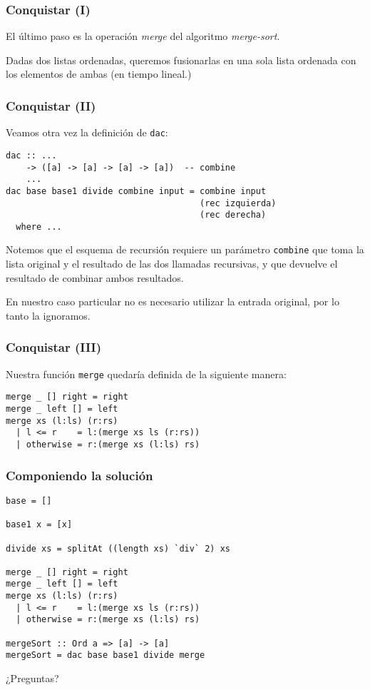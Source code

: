 \documentclass[spanish]{beamer}
\begin{document}
\begin{frame}
  \frametitle{Conquistar (I)}

  El último paso es la operación \textit{merge} del algoritmo
  \textit{merge-sort}.

  \vspace{1em}

  Dadas dos listas ordenadas, queremos fusionarlas en una
  sola lista ordenada con los elementos de ambas (en tiempo lineal.)
\end{frame}

\begin{frame}[fragile]
  \frametitle{Conquistar (II)}

  Veamos otra vez la definición de \texttt{dac}:

  \vspace{1em}

  \begin{Verbatim}
dac :: ...
    -> ([a] -> [a] -> [a] -> [a])  -- combine
    ...
dac base base1 divide combine input = combine input
                                      (rec izquierda)
                                      (rec derecha)
  where ...
  \end{Verbatim}

  \vspace{1em}

  Notemos que el esquema de recursión requiere un parámetro \texttt{combine}
  que toma la lista original y el resultado de las dos llamadas recursivas, y
  que devuelve el resultado de combinar ambos resultados.

  \vspace{1em}

  En nuestro caso particular no es necesario utilizar la entrada original, por
  lo tanto la ignoramos.
\end{frame}

\begin{frame}[fragile]
  \frametitle{Conquistar (III)}
  Nuestra función \texttt{merge} quedaría definida de la siguiente manera:

  \vspace{1em}

  \begin{Verbatim}
merge _ [] right = right
merge _ left [] = left
merge xs (l:ls) (r:rs)
  | l <= r    = l:(merge xs ls (r:rs))
  | otherwise = r:(merge xs (l:ls) rs)
  \end{Verbatim}
\end{frame}

\begin{frame}[fragile]
  \frametitle{Componiendo la solución}

  \begin{Verbatim}
base = []

base1 x = [x]

divide xs = splitAt ((length xs) `div` 2) xs

merge _ [] right = right
merge _ left [] = left
merge xs (l:ls) (r:rs)
  | l <= r    = l:(merge xs ls (r:rs))
  | otherwise = r:(merge xs (l:ls) rs)

mergeSort :: Ord a => [a] -> [a]
mergeSort = dac base base1 divide merge
  \end{Verbatim}
\end{frame}

\begin{frame}
  \begin{center}
    \Huge{¿Preguntas?}
  \end{center}
\end{frame}
\end{document}
